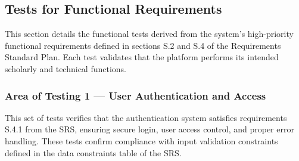 \documentclass[12pt, titlepage]{article}
\begin{document}
\subsection{Tests for Functional Requirements}

This section details the functional tests derived from the system’s high-priority functional requirements defined in sections S.2 and S.4 of the Requirements Standard Plan. Each test validates that the platform performs its intended scholarly and technical functions.

\subsubsection{Area of Testing 1 — User Authentication and Access}

This set of tests verifies that the authentication system satisfies requirements S.4.1 from the SRS, ensuring secure login, user access control, and proper error handling. These tests confirm compliance with input validation constraints defined in the data constraints table of the SRS.
\end{document}
